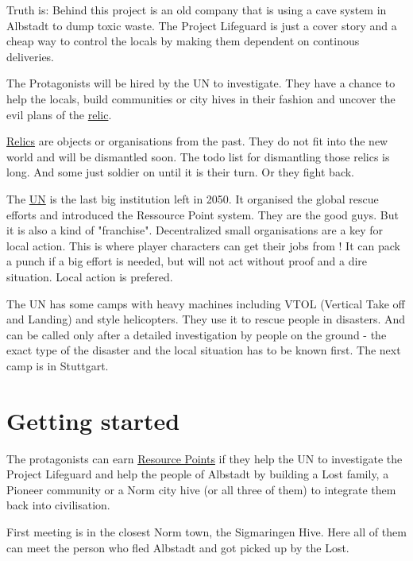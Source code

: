 Truth is: Behind this project is an old company that is using a cave system in Albstadt to dump toxic waste. The Project Lifeguard is just a cover story and a cheap way to control the locals by making them dependent on continous deliveries.

The Protagonists will be hired by the UN to investigate. They have a chance to help the locals, build communities or city hives in their fashion and uncover the evil plans of the \hyperref[sec: Relic]{relic}.

\begin{sidebarBox}[title=Relics]
\hyperref[sec: Relic]{Relics} are objects or organisations from the past. They do not fit into the new world and will be dismantled soon. The todo list for dismantling those relics is long. And some just soldier on until it is their turn. Or they fight back.
\end{sidebarBox}

\begin{sidebarBox}[title=UN]
The \hyperref[sec: UN]{UN} is the last big institution left in 2050. It organised the global rescue efforts and introduced the Ressource Point system. They are the good guys.
But it is also a kind of "franchise". Decentralized small organisations are a key for local action. This is where player characters can get their jobs from !
It can pack a punch if a big effort is needed, but will not act without proof and a dire situation.
Local action is prefered.

The UN has some camps with heavy machines including VTOL (Vertical Take off and Landing) and style helicopters. They use it to rescue people in disasters. And can be called only after a detailed investigation by people on the ground - the exact type of the disaster and the local situation has to be known first. The next camp is in Stuttgart.
\end{sidebarBox}

\section{Getting started}

The protagonists can earn \hyperref[sec:Resource Points]{Resource Points} if they help the UN to investigate the Project Lifeguard and help the people of Albstadt by building a Lost family, a Pioneer community or a Norm city hive (or all three of them) to integrate them back into civilisation.

First meeting is in the closest Norm town, the Sigmaringen Hive. Here all of them can meet the person who fled Albstadt and got picked up by the Lost.

